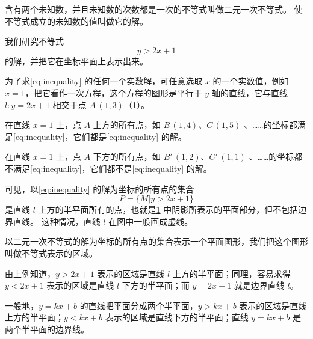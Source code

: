 含有两个未知数，并且未知数的次数都是一次的不等式叫做二元一次不等式。
使不等式成立的未知数的值叫做它的解。

我们研究不等式
\begin{equation}
  \label{eq:inequality}
  y > 2x + 1
\end{equation}
的解，并把它在坐标平面上表示出来。

为了求\cref{eq:inequality} 的任何一个实数解，可任意选取 $x$ 的一个实数值，例如 $x=1$，把它看作一次方程，这个方程的图形是平行于 $y$ 轴的直线，它与直线 $l:y=2x+ 1$ 相交于点 $A\,(1,3)$（\cref{fig:1-24}）。

在直线 $x=1$ 上，点 $A$ 上方的所有点，如 $B\,(1,4)$、$C\,(1,5)$ 、……的坐标都满足\cref{eq:inequality}，它们都是\cref{eq:inequality} 的解。

在直线 $x=1$ 上，点 $A$ 下方的所有点，如 $B'\,(1,2)$、$C'\,(1,1)$ 、……的坐标都不满足\cref{eq:inequality}，它们都不是\cref{eq:inequality} 的解。

可见，以\cref{eq:inequality} 的解为坐标的所有点的集合
\[P=\{M|y>2x+1\}\]
是直线 $l$ 上方的半平面所有的点，也就是\cref{fig:1-24} 中阴影所表示的平面部分，但不包括边界直线。
这种情况，直线 $l$ 在图中一般画成虚线。
\begin{figure}
  \caption{}\label{fig:1-24}
\end{figure}

以二元一次不等式的解为坐标的所有点的集合表示一个平面图形，我们把这个图形叫做不等式表示的区域。

由上例知道，$y>2x+1$ 表示的区域是直线 $l$ 上方的半平面；同理，容易求得 $y<2x+1$ 表示的区域是直线 $l$ 下方的半平面；而 $y=2x+1$ 就是边界直线 $l$。

一般地，$y=kx+b$ 的直线把平面分成两个半平面，$y>kx+b$ 表示的区域是直线上方的半平面；$y<kx+b$ 表示的区域是直线下方的半平面；直线 $y=kx+b$ 是两个半平面的边界线。

